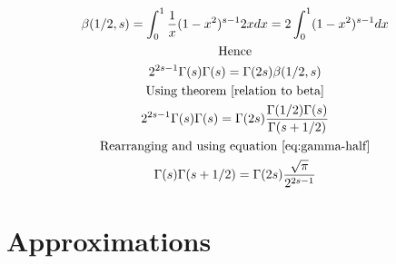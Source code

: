 \documentclass[a4paper]{article}
\begin{document}
\begin{theorem}
\begin{gather*}
            \beta(1/2, s)
            =
            \int_{0}^{1} \frac{1}{x}(1-x^2)^{s-1} 2x dx
            =
            2\int_{0}^{1} (1-x^2)^{s-1} dx
            \\
            \text{Hence}
            \\
            2^{2s -1} \Gamma(s) \Gamma(s)= \Gamma(2s) \beta(1/2, s)
            \\
            \text{Using theorem~\ref{relation to beta}}
            \\
            2^{2s -1} \Gamma(s) \Gamma(s)= \Gamma(2s) \frac{\Gamma(1/2) \Gamma(s)}{\Gamma(s+1/2)}
            \\
            \text{Rearranging and using equation~\ref{eq:gamma-half}}
            \\
            \Gamma(s) \Gamma(s+1/2)= \Gamma(2s) \frac{\sqrt{\pi}}{2^{2s -1}}
        \end{gather*}
    \end{theorem}

    \pagebreak


    \section{Approximations}\label{sec:approximations}
\end{document}
